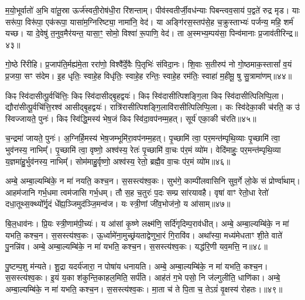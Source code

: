 {\anuvakamend[{नम॒ एका॒न्नत्रि॒ꣳ॒शत्॥16॥}]}

म॒यो॒भूर्वातो॑ अ॒भि वा॑तू॒स्रा ऊर्ज॑स्वती॒रोष॑धी॒रा रि॑शन्ताम्। पीव॑स्वतीर्जी॒वध॑न्याः पिबन्त्वव॒साय॑ प॒द्वते॑ रुद्र मृड। याः सरू॑पा॒ विरू॑पा॒ एक॑रूपा॒ यासा॑म॒ग्निरिष्ट्या॒ नामा॑नि॒ वेद॑। या अङ्गि॑रस॒स्तप॑से॒ह च॒क्रुस्ताभ्यः॑ पर्जन्य॒ महि॒ शर्म॑ यच्छ। या दे॒वेषु॑ त॒नुव॒मैर॑यन्त॒ यासा॒ꣳ॒ सोमो॒ विश्वा॑ रू॒पाणि॒ वेद॑। ता अ॒स्मभ्य॒म्पय॑सा॒ पिन्व॑मानाः प्र॒जाव॑तीरिन्द्र॥४३॥

गो॒ष्ठे रि॑रीहि। प्र॒जाप॑ति॒र्मह्य॑मे॒ता ररा॑णो॒ विश्वै᳚र्दे॒वैः पि॒तृभिः॑ संविदा॒नः। शि॒वाः स॒तीरुप॑ नो गो॒ष्ठमाक॒स्तासां᳚ व॒यं प्र॒जया॒ सꣳ स॑देम। इ॒ह धृतिः॒ स्वाहे॒ह विधृ॑तिः॒ स्वाहे॒ह रन्तिः॒ स्वाहे॒ह रम॑तिः॒ स्वाहा॑ म॒हीमू॒ षु सु॒त्रामा॑णम्॥४४॥

{\anuvakamend[{इ॒न्द्रा॒ष्टात्रिꣳ॑शच्च॥17॥}]}

किꣴ स्वि॑दासीत्पू॒र्वचि॑त्तिः॒ किꣴ स्वि॑दासीद्बृ॒हद्वयः॑। किꣴ स्वि॑दासीत्पिशङ्गि॒ला किꣴ स्वि॑दासीत्पिलिप्पि॒ला। द्यौरा॑सीत्पू॒र्वचि॑त्ति॒रश्व॑ आसीद्बृ॒हद्वयः॑। रात्रि॑रासीत्पिशङ्गि॒लावि॑रासीत्पिलिप्पि॒ला। कः स्वि॑देका॒की च॑रति॒ क उ॑ स्विज्जायते॒ पुनः॑। किꣴ स्वि॑द्धि॒मस्य॑ भेष॒जं किꣴ स्वि॑दा॒वप॑नम्म॒हत्। सूर्य॑ एका॒की च॑रति॥४५॥

च॒न्द्रमा॑ जायते॒ पुनः॑। अ॒ग्निर्\mbox{}हि॒मस्य॑ भेष॒जम्भूमि॑रा॒वप॑नम्म॒हत्। पृ॒च्छामि॑ त्वा॒ पर॒मन्त॑म्पृथि॒व्याः पृ॒च्छामि॑ त्वा॒ भुव॑नस्य॒ नाभिम्᳚। पृ॒च्छामि॑ त्वा॒ वृष्णो॒ अश्व॑स्य॒ रेतः॑ पृ॒च्छामि॑ वा॒चः प॑र॒मं व्यो॑म। वेदि॑माहुः॒ पर॒मन्त॑म्पृथि॒व्या य॒ज्ञमा॑हु॒र्भुव॑नस्य॒ नाभिम्᳚। सोम॑माहु॒र्वृष्णो॒ अश्व॑स्य॒ रेतो॒ ब्रह्मै॒व वा॒चः प॑र॒मं व्यो॑म॥४६॥

{\anuvakamend[{सूर्य॑ एका॒की च॑रति॒ षट्च॑त्वारिꣳशच्च॥18॥}]}

अम्बे॒ अम्बा॒ल्यम्बि॑के॒ न मा॑ नयति॒ कश्च॒न। स॒सस्त्य॑श्व॒कः। सुभ॑गे॒ काम्पी॑लवासिनि सुव॒र्गे लो॒के सं प्रोर्ण्वा॑थाम्। आहम॑जानि गर्भ॒धमा त्वम॑जासि गर्भ॒धम्। तौ स॒ह च॒तुरः॑ प॒दः सम्प्र सा॑रयावहै। वृषा॑ वाꣳ रेतो॒धा रेतो॑ दधा॒तूथ्स॒क्थ्यो᳚र्गृ॒दं धे᳚ह्य॒ञ्जिमुद॑ञ्जि॒मन्व॑ज। यः स्त्री॒णां जी॑व॒भोज॑नो॒ य आ॑साम्॥४७॥

बि॒ल॒धाव॑नः। प्रि॒यः स्त्री॒णाम॑पी॒च्यः॑। य आ॑सां कृ॒ष्णे लक्ष्म॑णि॒ सर्दि॑गृदिम्प॒राव॑धीत्। अम्बे॒ अम्बा॒ल्यम्बि॑के॒ न मा॑ यभति॒ कश्च॒न। स॒सस्त्य॑श्व॒कः। ऊ॒र्ध्वामे॑ना॒मुच्छ्र॑यताद्वेणुभा॒रं गि॒रावि॑व। अथा᳚स्या॒ मध्य॑मेधताꣳ शी॒ते वाते॑ पु॒नन्नि॑व। अम्बे॒ अम्बा॒ल्यम्बि॑के॒ न मा॑ यभति॒ कश्च॒न। स॒सस्त्य॑श्व॒कः। यद्ध॑रि॒णी यव॒मत्ति॒ न॥४८॥

पु॒ष्टम्प॒शु म॑न्यते। शू॒द्रा यदर्य॑जारा॒ न पोषा॑य धनायति। अम्बे॒ अम्बा॒ल्यम्बि॑के॒ न मा॑ यभति॒ कश्च॒न। स॒सस्त्य॑श्व॒कः। इ॒यं य॒का श॑कुन्ति॒काहल॒मिति॒ सर्प॑ति। आह॑तं ग॒भे पसो॒ नि ज॑ल्गुलीति॒ धाणि॑का। अम्बे॒ अम्बा॒ल्यम्बि॑के॒ न मा॑ यभति॒ कश्च॒न। स॒सस्त्य॑श्व॒कः। मा॒ता च॑ ते पि॒ता च॒ ते\-ऽग्रं॑ वृ॒क्षस्य॑ रोहतः।॥४९॥

